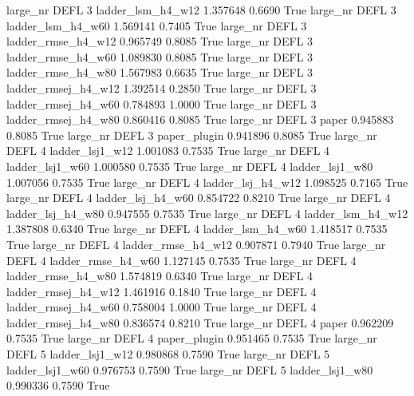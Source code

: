   large_nr     DEFL                 3   ladder_lsm_h4_w12    1.357648      0.6690    True
  large_nr     DEFL                 3   ladder_lsm_h4_w60    1.569141      0.7405    True
  large_nr     DEFL                 3  ladder_rmse_h4_w12    0.965749      0.8085    True
  large_nr     DEFL                 3  ladder_rmse_h4_w60    1.089830      0.8085    True
  large_nr     DEFL                 3  ladder_rmse_h4_w80    1.567983      0.6635    True
  large_nr     DEFL                 3 ladder_rmsej_h4_w12    1.392514      0.2850    True
  large_nr     DEFL                 3 ladder_rmsej_h4_w60    0.784893      1.0000    True
  large_nr     DEFL                 3 ladder_rmsej_h4_w80    0.860416      0.8085    True
  large_nr     DEFL                 3               paper    0.945883      0.8085    True
  large_nr     DEFL                 3        paper_plugin    0.941896      0.8085    True
  large_nr     DEFL                 4     ladder_lsj1_w12    1.001083      0.7535    True
  large_nr     DEFL                 4     ladder_lsj1_w60    1.000580      0.7535    True
  large_nr     DEFL                 4     ladder_lsj1_w80    1.007056      0.7535    True
  large_nr     DEFL                 4   ladder_lsj_h4_w12    1.098525      0.7165    True
  large_nr     DEFL                 4   ladder_lsj_h4_w60    0.854722      0.8210    True
  large_nr     DEFL                 4   ladder_lsj_h4_w80    0.947555      0.7535    True
  large_nr     DEFL                 4   ladder_lsm_h4_w12    1.387808      0.6340    True
  large_nr     DEFL                 4   ladder_lsm_h4_w60    1.418517      0.7535    True
  large_nr     DEFL                 4  ladder_rmse_h4_w12    0.907871      0.7940    True
  large_nr     DEFL                 4  ladder_rmse_h4_w60    1.127145      0.7535    True
  large_nr     DEFL                 4  ladder_rmse_h4_w80    1.574819      0.6340    True
  large_nr     DEFL                 4 ladder_rmsej_h4_w12    1.461916      0.1840    True
  large_nr     DEFL                 4 ladder_rmsej_h4_w60    0.758004      1.0000    True
  large_nr     DEFL                 4 ladder_rmsej_h4_w80    0.836574      0.8210    True
  large_nr     DEFL                 4               paper    0.962209      0.7535    True
  large_nr     DEFL                 4        paper_plugin    0.951465      0.7535    True
  large_nr     DEFL                 5     ladder_lsj1_w12    0.980868      0.7590    True
  large_nr     DEFL                 5     ladder_lsj1_w60    0.976753      0.7590    True
  large_nr     DEFL                 5     ladder_lsj1_w80    0.990336      0.7590    True
